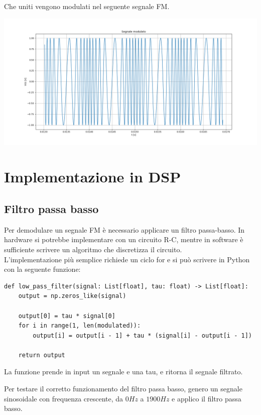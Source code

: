 \documentclass{article}
\begin{document}
\newpage
Che uniti vengono modulati nel seguente segnale FM.

\begin{center}
    \includegraphics[width=\textwidth]{modulato.png}
\end{center}


\section{Implementazione in DSP}
\subsection{Filtro passa basso}
Per demodulare un segnale FM è necessario applicare un filtro passa-basso. In hardware si potrebbe implementare
con un circuito R-C, mentre in software è sufficiente scrivere un algoritmo che discretizza il circuito.\\
L'implementazione più semplice richiede un ciclo for e si può scrivere in Python con la seguente funzione:

\begin{verbatim}
def low_pass_filter(signal: List[float], tau: float) -> List[float]:
    output = np.zeros_like(signal)

    output[0] = tau * signal[0]
    for i in range(1, len(modulated)):
        output[i] = output[i - 1] + tau * (signal[i] - output[i - 1])

    return output
\end{verbatim}

La funzione prende in input un segnale e una tau, e ritorna il segnale filtrato.

Per testare il corretto funzionamento del filtro passa basso, genero un segnale sinosoidale
con frequenza crescente, da $0 Hz$ a $1900 Hz$ e applico il filtro passa basso.
\end{document}
